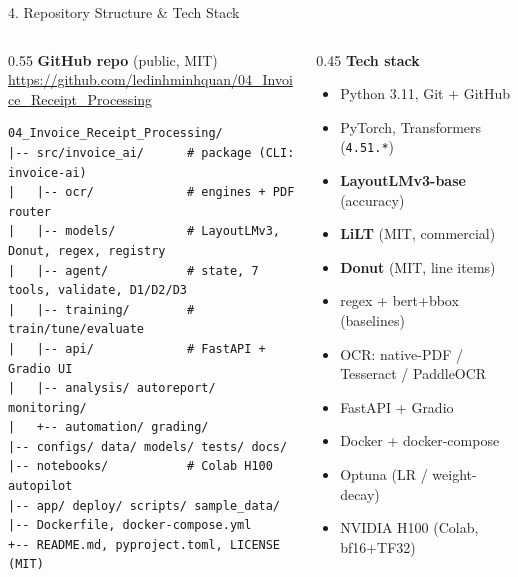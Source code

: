 \documentclass[10pt,aspectratio=169]{beamer}
\begin{document}
\begin{frame}[fragile]{4. Repository Structure \& Tech Stack}
\begin{columns}[T]
\begin{column}{0.55\textwidth}
\textbf{GitHub repo} (public, MIT) \\
\scriptsize \url{https://github.com/ledinhminhquan/04_Invoice_Receipt_Processing}

\vspace{0.15cm}
\begin{lstlisting}[basicstyle=\ttfamily\tiny]
04_Invoice_Receipt_Processing/
|-- src/invoice_ai/      # package (CLI: invoice-ai)
|   |-- ocr/             # engines + PDF router
|   |-- models/          # LayoutLMv3, Donut, regex, registry
|   |-- agent/           # state, 7 tools, validate, D1/D2/D3
|   |-- training/        # train/tune/evaluate
|   |-- api/             # FastAPI + Gradio UI
|   |-- analysis/ autoreport/ monitoring/
|   +-- automation/ grading/
|-- configs/ data/ models/ tests/ docs/
|-- notebooks/           # Colab H100 autopilot
|-- app/ deploy/ scripts/ sample_data/
|-- Dockerfile, docker-compose.yml
+-- README.md, pyproject.toml, LICENSE (MIT)
\end{lstlisting}
\end{column}
\begin{column}{0.45\textwidth}
\textbf{Tech stack}
\begin{itemize}\small
  \item Python 3.11, Git + GitHub
  \item PyTorch, Transformers (\texttt{4.51.*})
  \item \textbf{LayoutLMv3-base} (accuracy)
  \item \textbf{LiLT} (MIT, commercial)
  \item \textbf{Donut} (MIT, line items)
  \item regex + bert+bbox (baselines)
  \item OCR: native-PDF / Tesseract / PaddleOCR
  \item FastAPI + Gradio
  \item Docker + docker-compose
  \item Optuna (LR / weight-decay)
  \item NVIDIA H100 (Colab, bf16+TF32)
\end{itemize}
\end{column}
\end{columns}
\end{frame}
\end{document}
